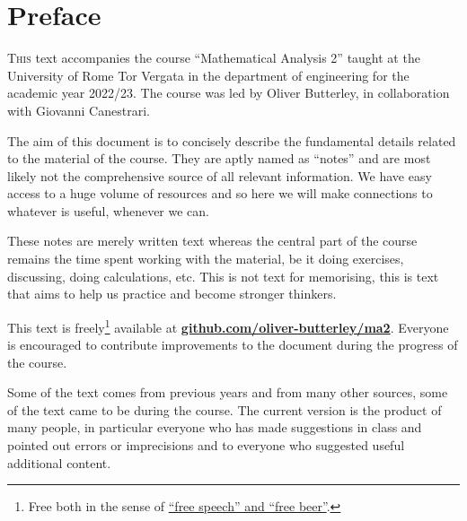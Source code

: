 \chapter{Preface}
\lettrine{T}{his} text accompanies the course ``Mathematical Analysis 2'' taught at the University of Rome Tor Vergata in the department of engineering for the academic year 2022/23.
The course was led by Oliver Butterley, in collaboration with Giovanni Canestrari. 

The aim of this document is to concisely describe the fundamental details related to the material of the course.
They are aptly named as ``notes'' and are most likely not the comprehensive source of all relevant information.
We have easy access to a huge volume of resources and so here we will make connections to whatever is useful, whenever we can. 

These notes are merely written text whereas the central part of the course remains the time spent working with the material, be it doing exercises, discussing, doing calculations, etc. This is not text for memorising, this is text that aims to help us practice and become stronger thinkers.

This text is freely\footnote{Free both in the sense of \href{https://en.wikipedia.org/wiki/Gratis_versus_libre}{``free speech'' and ``free beer''}.} available at \href{https://github.com/oliver-butterley/ma2}{\textbf{github.com/oliver-butterley/ma2}}.
Everyone is encouraged to contribute improvements to the document during the progress of the course. 

Some of the text comes from previous years and from many other sources, some of the text came to be during the course.
The current version is the product of many people, in particular everyone who has made suggestions in class and pointed out errors or imprecisions and to everyone who suggested useful additional content.


